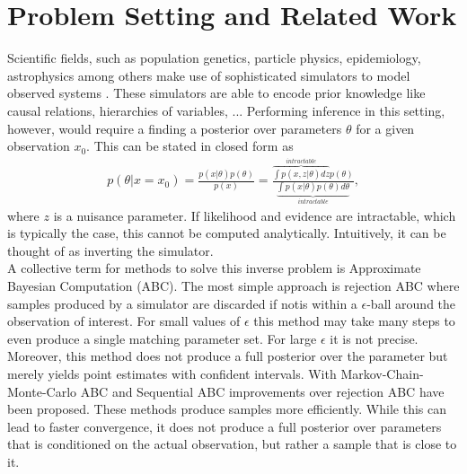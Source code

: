 \documentclass[12pt]{article}
\title{\vskip-3em \bf 
	Simulation-based Inference
    }
\author{
    A Summary Written by Stefan Wezel \\
    \texttt{stefan.wezel@student.uni-tuebingen.de}
}
\date{\it Machine Learning for and with Dynamical Systems\\Summer Term 2021}
\begin{document}
\maketitle



\section*{Problem Setting and Related Work}
Scientific fields, such as population genetics, particle physics, epidemiology, astrophysics among others make use of sophisticated simulators to model observed systems \citep{brehmer2020simulation, de2020simulation, delaunoy2020lightning,cranmer2020frontier, pritchard1999population}. These simulators are able to encode prior knowledge like causal relations, hierarchies of variables, ... Performing inference in this setting, however, would require a finding a posterior over parameters $\theta$ for a given observation $x_0$. This can be stated in closed form as 
\begin{align}
	p(\theta|x=x_0) = \frac{p(x|\theta)p(\theta)}{p(x)} = \frac{\overbrace{\int p(x,z|\theta)dz}^{intractable} p(\theta)}{\underbrace{\int p(x|\theta)p(\theta)d\theta}_{intractable}},
\end{align}
where $z$ is a nuisance parameter. If likelihood and evidence are intractable, which is typically the case, this cannot be computed analytically. Intuitively, it can be thought of as inverting the simulator.\\
A collective term for methods to solve this inverse problem is Approximate Bayesian Computation (ABC). The most simple approach is rejection ABC \citep{pritchard1999population} where samples produced by a simulator are discarded if notis within a $\epsilon$-ball around the observation of interest. For small values of $\epsilon$ this method may take many steps to even produce a single matching parameter set. For large $\epsilon$ it is not precise. Moreover, this method does not produce a full posterior over the parameter but merely yields point estimates with confident intervals. With Markov-Chain-Monte-Carlo ABC and Sequential ABC improvements over rejection ABC have been proposed. These methods produce samples more efficiently. While this can lead to faster convergence, it does not produce a full posterior over parameters that is conditioned on the actual observation, but rather a sample that is close to it.
\end{document}
